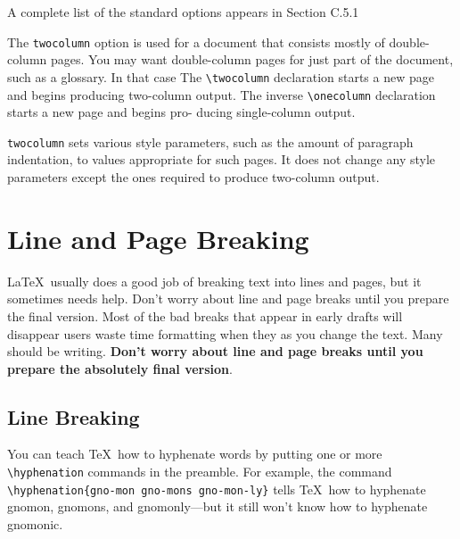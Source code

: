 \documentclass{article}
\newcommand{\justtext}[1]{\texttt{\textbackslash #1}}
\begin{document}
A complete list of the standard options appears in Section C.5.1 %

The {\tt twocolumn} option is used for a document that consists mostly of double-column pages. You
may want double-column pages for just part of the document, such as a glossary. In that case
The \justtext{twocolumn} declaration starts a new page and begins producing two-column output. The
inverse \justtext{onecolumn} declaration starts a new page and begins pro- ducing single-column
output.

{\tt twocolumn} sets various style parameters, such as the amount of paragraph indentation, to
values appropriate for such pages. It does not change any style parameters except the ones required
to produce two-column output.



\section{Line and Page Breaking}

\LaTeX\ usually does a good job of breaking text into lines and pages, but it sometimes needs help.
Don't worry about line and page breaks until you prepare the final version. Most of the bad breaks
that appear in early drafts will disappear users waste time formatting when they as you change the
text. Many should be writing. \textbf{Don't worry about line and page breaks until you prepare the
absolutely final version}.

\subsection{Line Breaking}\label{sub-line-break}

You can teach \TeX\ how to hyphenate words by putting one or more \justtext{hyphenation} commands in
the preamble. For example, the command \justtext{hyphenation\{gno-mon gno-mons gno-mon-ly\}}
tells \TeX\ how to hyphenate gnomon, gnomons, and gnomonly---but it still won't
know how to hyphenate gnomonic.
\end{document}
